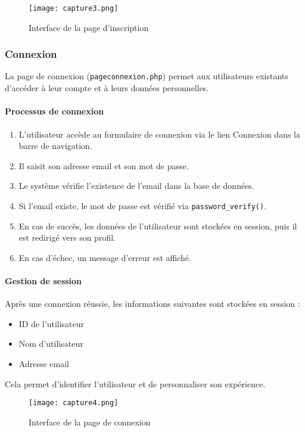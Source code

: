\documentclass[a4paper,12pt]{article}
\begin{document}
\begin{figure}[H]
  \centering
  \texttt{[image: capture3.png]}
  \caption{Interface de la page d'inscription}
\end{figure}
\subsubsection{Connexion}

La page de connexion (\texttt{pageconnexion.php}) permet aux utilisateurs existants d'accéder à leur compte et à leurs données personnelles.

\paragraph{Processus de connexion}

\begin{enumerate}
  \item L'utilisateur accède au formulaire de connexion via le lien \og Connexion \fg{} dans la barre de navigation.
  \item Il saisit son adresse email et son mot de passe.
  \item Le système vérifie l'existence de l'email dans la base de données.
  \item Si l'email existe, le mot de passe est vérifié via \texttt{password\_verify()}.
  \item En cas de succès, les données de l’utilisateur sont stockées en session, puis il est redirigé vers son profil.
  \item En cas d’échec, un message d’erreur est affiché.
\end{enumerate}

\paragraph{Gestion de session}

Après une connexion réussie, les informations suivantes sont stockées en session :
\begin{itemize}
  \item ID de l'utilisateur
  \item Nom d'utilisateur
  \item Adresse email
\end{itemize}

Cela permet d’identifier l’utilisateur et de personnaliser son expérience.

\begin{figure}[H]
  \centering
  \texttt{[image: capture4.png]}
  \caption{Interface de la page de connexion}
\end{figure}
\end{document}
